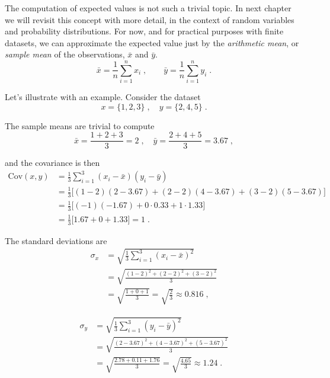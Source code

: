 \documentclass{book}
\begin{document}
The computation of expected values is not such a trivial topic. In next chapter we will revisit this concept with more detail, in the context of random variables and probability distributions. For now, and for practical purposes with finite datasets, we can approximate the expected value just by the \textit{arithmetic mean}, or \textit{sample mean} of the observations, $\bar{x}$ and $\bar{y}$. 
\begin{equation}
	\bar{x} = \frac{1}{n} \sum_{i=1}^{n} x_i \; , \qquad \bar{y} = \frac{1}{n} \sum_{i=1}^{n} y_i \; . \nonumber
\end{equation}

Let's illustrate with an example. Consider the dataset  
\begin{equation}
	x = \{1, 2, 3\} \; , \quad y = \{2, 4, 5\} \; .
\end{equation}

The sample means are trivial to compute
\begin{equation}
	\bar{x} = \frac{1 + 2 + 3}{3} = 2 \; , \quad 
	\bar{y} = \frac{2 + 4 + 5}{3} = 3.67 \; , \nonumber
\end{equation}

and the covariance is then
\begin{align}
	\mathrm{Cov}(x, y) 
	&= \frac{1}{3} \sum_{i=1}^3 (x_i - \bar{x})(y_i - \bar{y}) \nonumber \\[2mm]
	&= \frac{1}{3} \Big[ (1-2)(2-3.67) + (2-2)(4-3.67) + (3-2)(5-3.67) \Big] \nonumber \\[1mm]
	&= \frac{1}{3} \Big[ (-1)(-1.67) + 0 \cdot 0.33 + 1 \cdot 1.33 \Big] \nonumber \\[1mm]
	&= \frac{1}{3} \big[ 1.67 + 0 + 1.33 \big] = 1 \; .\nonumber
\end{align}

The standard deviations are  
\begin{align}
	\sigma_x 
	&= \sqrt{\frac{1}{3} \sum_{i=1}^3 (x_i - \bar{x})^2} \nonumber \\[1mm]
	&= \sqrt{\frac{(1-2)^2 + (2-2)^2 + (3-2)^2}{3}} \nonumber \\[1mm]
	&= \sqrt{\frac{1 + 0 + 1}{3}} = \sqrt{\frac{2}{3}} \approx 0.816 \; , \nonumber
\end{align}

\begin{align}
	\sigma_y 
	&= \sqrt{\frac{1}{3} \sum_{i=1}^3 (y_i - \bar{y})^2} \nonumber \\[1mm]
	&= \sqrt{\frac{(2-3.67)^2 + (4-3.67)^2 + (5-3.67)^2}{3}} \nonumber \\[1mm]
	&= \sqrt{\frac{2.78 + 0.11 + 1.76}{3}} = \sqrt{\frac{4.65}{3}} \approx 1.24 \; . \nonumber
\end{align}
\end{document}
